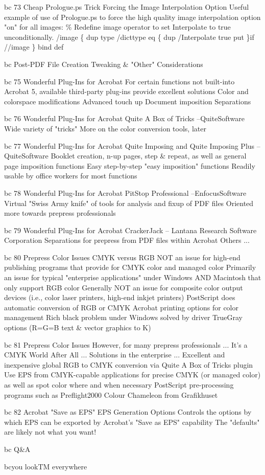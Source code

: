 \documentclass[11pt,a4paper]{article}
\begin{document}
bc 73 Cheap Prologue.ps Trick Forcing the Image Interpolation Option Useful example of use of Prologue.ps to force the high quality image interpolation option "on" for all images: \% Redefine image operator to set Interpolate to true unconditionally. /image \{ dup type /dicttype eq \{ dup /Interpolate true put \}if //image \} bind def

bc Post-PDF File Creation Tweaking \& "Other" Considerations

bc 75 Wonderful Plug-Ins for Acrobat For certain functions not built-into Acrobat 5, available third-party plug-ins provide excellent solutions Color and colorspace modifications Advanced touch up Document imposition Separations

bc 76 Wonderful Plug-Ins for Acrobat Quite A Box of Tricks --QuiteSoftware Wide variety of "tricks" More on the color conversion tools, later

bc 77 Wonderful Plug-Ins for Acrobat Quite Imposing and Quite Imposing Plus --QuiteSoftware Booklet creation, n-up pages, step \& repeat, as well as general page imposition functions Easy step-by-step "easy imposition" functions Readily usable by office workers for most functions

bc 78 Wonderful Plug-Ins for Acrobat PitStop Professional --EnfocusSoftware Virtual "Swiss Army knife" of tools for analysis and fixup of PDF files Oriented more towards prepress professionals

bc 79 Wonderful Plug-Ins for Acrobat CrackerJack -- Lantana Research Software Corporation Separations for prepress from PDF files within Acrobat Others ...

bc 80 Prepress Color Issues CMYK versus RGB NOT an issue for high-end publishing programs that provide for CMYK color and managed color Primarily an issue for typical "enterprise applications" under Windows AND Macintosh that only support RGB color Generally NOT an issue for composite color output devices (i.e., color laser printers, high-end inkjet printers) PostScript does automatic conversion of RGB or CMYK Acrobat printing options for color management Rich black problem under Windows solved by driver TrueGray options (R=G=B text \& vector graphics to K)

bc 81 Prepress Color Issues However, for many prepress professionals ... It's a CMYK World After All ... Solutions in the enterprise ... Excellent and inexpensive global RGB to CMYK conversion via Quite A Box of Tricks plugin Use EPS from CMYK-capable applications for precise CMYK (or managed color) as well as spot color where and when necessary PostScript pre-processing programs such as Preflight2000 Colour Chameleon from Grafikhuset

bc 82 Acrobat "Save as EPS" EPS Generation Options Controls the options by which EPS can be exported by Acrobat's "Save as EPS" capability The "defaults" are likely not what you want!

bc Q\&A

bcyou lookTM everywhere
\end{document}
